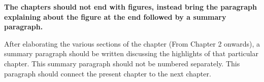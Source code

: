 \vspace{0.75cm}

 \textbf{The chapters should not end with figures, instead bring the paragraph explaining about the figure at the end followed by a summary paragraph.}

After elaborating the various sections of the chapter (From Chapter 2 onwards), a summary paragraph should be written discussing the highlights of that particular chapter. This summary paragraph should not be numbered separately. This paragraph should connect the present chapter to the next chapter.  